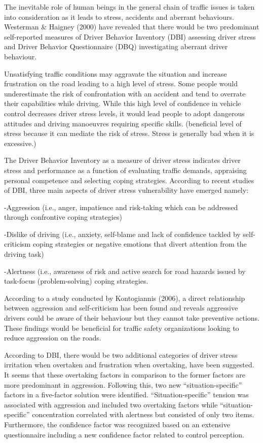 \documentclass[
11pt, %
oneside, %
english, %
singlespacing, %
]{macthesis} %
\begin{document}
The inevitable role of human beings in the general chain of traffic issues is taken into consideration as it leads to stress, accidents and aberrant behaviours. Westerman \& Haigney (2000) have revealed that there would be two predominant self-reported measures of Driver Behavior Inventory (DBI) assessing driver stress and Driver Behavior Questionnaire (DBQ) investigating aberrant driver behaviour.

Unsatisfying traffic conditions may aggravate the situation and increase frustration on the road leading to a high level of stress. Some people would underestimate the risk of confrontation with an accident and tend to overrate their capabilities while driving. While this high level of confidence in vehicle control decreases driver stress levels, it would lead people to adopt dangerous attitudes and driving manoeuvres requiring specific skills. (beneficial level of stress because it can mediate the risk of stress. Stress is generally bad when it is excessive.)

The Driver Behavior Inventory as a measure of driver stress indicates driver stress and performance as a function of evaluating traffic demands, appraising personal competence and selecting coping strategies. According to recent studies of DBI, three main aspects of driver stress vulnerability have emerged namely:

-Aggression (i.e., anger, impatience and risk-taking which can be addressed through confrontive coping strategies)

-Dislike of driving (i.e., anxiety, self-blame and lack of confidence tackled by self-criticism coping strategies or negative emotions that divert attention from the driving task)

-Alertness (i.e., awareness of risk and active search for road hazards issued by task-focus (problem-solving) coping strategies.

According to a study conducted by Kontogiannis (2006), a direct relationship between aggression and self-criticism has been found and reveals aggressive drivers could be aware of their behaviour but they cannot take preventive actions. These findings would be beneficial for traffic safety organizations looking to reduce aggression on the roads.

According to DBI, there would be two additional categories of driver stress irritation when overtaken and frustration when overtaking, have been suggested. It seems that these overtaking factors in comparison to the former factors are more predominant in aggression. Following this, two new ``situation-specific'' factors in a five-factor solution were identified. ``Situation-specific'' tension was associated with aggression and included two overtaking factors while ``situation-specific'' concentration correlated with alertness but consisted of only two items. Furthermore, the confidence factor was recognized based on an extensive questionnaire including a new confidence factor related to control perception.
\end{document}

